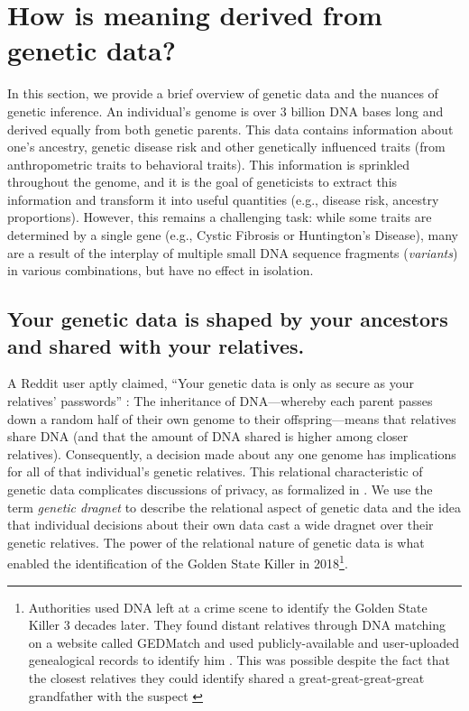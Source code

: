 \section{How is meaning derived from genetic data?}
\label{section:genetic_data}
In this section, we provide a brief overview of genetic data and the nuances of genetic inference. An individual's genome is over 3 billion DNA bases long and derived equally from both genetic parents. This data contains information about one's ancestry, genetic disease risk and other genetically influenced traits (from anthropometric traits to behavioral traits). This information is sprinkled throughout the genome, and it is the goal of geneticists to extract this information and transform it into useful quantities (e.g., disease risk, ancestry proportions). However, this remains a challenging task: while some traits are determined by a single gene (e.g., Cystic Fibrosis or Huntington's Disease), many are a result of the interplay of multiple small DNA sequence fragments (\emph{variants}) in various combinations, but have no effect in isolation. 


\subsection{Your genetic data is shaped by your ancestors and shared with your relatives.}


A Reddit user aptly claimed, ``Your genetic data is only as secure as your relatives' passwords'' : The inheritance of DNA—whereby each parent passes down a random half of their own genome to their offspring—means that relatives share DNA (and that the amount of DNA shared is higher among closer relatives). Consequently, a decision made about any one genome has implications for all of that individual's genetic relatives. This relational characteristic of genetic data complicates discussions of privacy, as formalized in \cite{costello_genetic_2022}. We use the term \textit{genetic dragnet} to describe the relational aspect of genetic data and the idea that individual decisions about their own data cast a wide dragnet over their genetic relatives. The power of the relational nature of genetic data is what enabled the identification of the Golden State Killer in 2018\footnote{Authorities used DNA left at a crime scene to identify the Golden State Killer 3 decades later. They found distant relatives through DNA matching on a website called GEDMatch and used publicly-available and user-uploaded genealogical records to identify him \cite{kaiser_we_2018}. This was possible despite the fact that the closest relatives they could identify shared a great-great-great-great grandfather with the suspect \cite{zabel_killer_2019}}.

